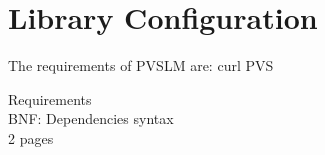 \section{Library Configuration}
\label{ssec:config}

The requirements of PVSLM are:
curl
PVS



Requirements\\
BNF: Dependencies syntax\\
2 pages

